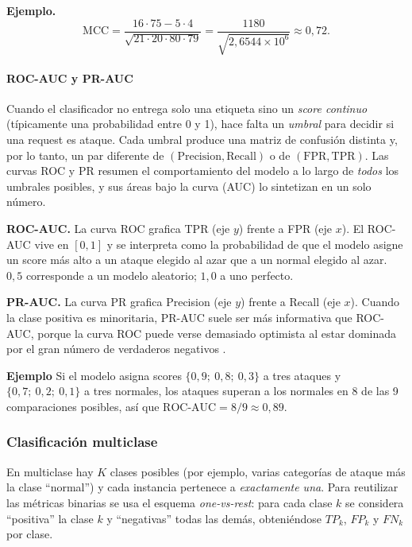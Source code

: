 \documentclass[12pt,oneside]{report}
\begin{document}
\textbf{Ejemplo.}
\[
\mathrm{MCC}=\frac{16\cdot 75 - 5\cdot 4}{\sqrt{21\cdot 20\cdot 80\cdot 79}}
=\frac{1180}{\sqrt{2{,}6544\times 10^{6}}}\approx 0{,}72.
\]

\paragraph{ROC-AUC y PR-AUC}

Cuando el clasificador no entrega solo una etiqueta sino un \emph{score
continuo} (típicamente una probabilidad entre 0 y 1), hace falta un
\emph{umbral} para decidir si una request es ataque. Cada umbral produce
una matriz de confusión distinta y, por lo tanto, un par diferente de
$(\mathrm{Precision},\mathrm{Recall})$ o de $(\mathrm{FPR},\mathrm{TPR})$.
Las curvas ROC y PR resumen el comportamiento del modelo a lo largo de
\emph{todos} los umbrales posibles, y sus áreas bajo la curva (AUC) lo
sintetizan en un solo número.

\textbf{ROC-AUC.} La curva ROC grafica TPR (eje $y$) frente a FPR (eje
$x$). El ROC-AUC vive en $[0,1]$ y se interpreta como la probabilidad de
que el modelo asigne un score más alto a un ataque elegido al azar que a
un normal elegido al azar. $0{,}5$ corresponde a un modelo aleatorio;
$1{,}0$ a uno perfecto.

\textbf{PR-AUC.} La curva PR grafica Precision (eje $y$) frente a Recall
(eje $x$). Cuando la clase positiva es minoritaria, PR-AUC suele ser más
informativa que ROC-AUC, porque la curva ROC puede verse demasiado
optimista al estar dominada por el gran número de verdaderos negativos
\cite{saito_pr_auc}.

\textbf{Ejemplo} Si el modelo asigna scores
$\{0{,}9;\ 0{,}8;\ 0{,}3\}$ a tres ataques y
$\{0{,}7;\ 0{,}2;\ 0{,}1\}$ a tres normales, los ataques superan a los
normales en 8 de las 9 comparaciones posibles, así que
$\mathrm{ROC\text{-}AUC}=8/9\approx 0{,}89$.

\subsubsection{Clasificación multiclase}

En multiclase hay $K$ clases posibles (por ejemplo, varias categorías de
ataque más la clase ``normal'') y cada instancia pertenece a
\emph{exactamente una}. Para reutilizar las métricas binarias se usa el
esquema \emph{one-vs-rest}: para cada clase $k$ se considera ``positiva''
la clase $k$ y ``negativas'' todas las demás, obteniéndose $TP_k$,
$FP_k$ y $FN_k$ por clase.
\end{document}
